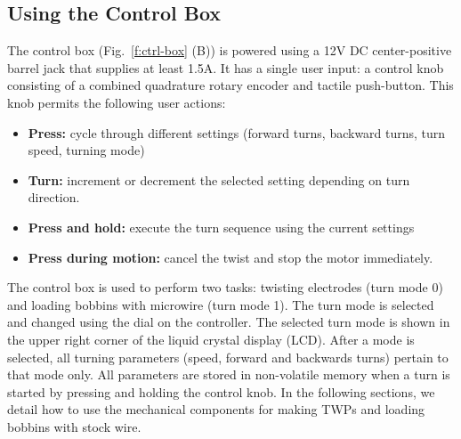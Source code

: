 \documentclass[11pt,a4paper]{article}
\begin{document}
\subsection{Using the Control Box}
The control box (Fig.~\ref{f:ctrl-box} (B)) is powered using a 12V DC
center-positive barrel jack that supplies at least 1.5A. It has a single user
input: a control knob consisting of a combined quadrature rotary encoder and
tactile push-button. This knob permits the following user actions:

\begin{itemize}[noitemsep]
    \item \textbf{Press:} cycle through different settings (forward turns,
        backward turns, turn speed, turning mode)
    \item \textbf{Turn:} increment or decrement the selected setting
        depending on turn direction.
    \item \textbf{Press and hold:} execute the turn sequence using the
        current settings
    \item \textbf{Press during motion:} cancel the twist and stop the motor
        immediately.
\end{itemize}

The control box is used to perform two tasks: twisting electrodes (turn mode 0)
and loading bobbins with microwire (turn mode 1). The turn mode is selected and
changed using the dial on the controller. The selected turn mode is shown in
the upper right corner of the liquid crystal display (LCD). After a mode is
selected, all turning parameters (speed, forward and backwards turns) pertain
to that mode only. All parameters are stored in non-volatile memory when a turn
is started by pressing and holding the control knob. In the following sections,
we detail how to use the mechanical components for making TWPs and loading
bobbins with stock wire.
\end{document}
